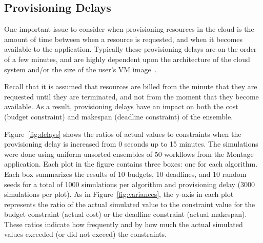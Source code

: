 \documentclass[conference]{IEEEtran}
\begin{document}
\subsection{Provisioning Delays}
\label{sec:delays}

One important issue to consider when provisioning resources in the cloud is the amount of time between when a resource is requested, and when it becomes available to the application. Typically these provisioning delays are on the order of a few minutes, and are highly dependent upon the architecture of the cloud system and/or the size of the user's VM image~\cite{Nurmi2008b}.

Recall that it is assumed that resources are billed from the minute that they are requested until they are terminated, and not from the moment that they become available. As a result, provisioning delays have an impact on both the cost (budget constraint) and makespan (deadline constraint) of the ensemble.

Figure~\ref{fig:delays} shows the ratios of actual values to constraints when the provisioning delay is increased from 0 seconds up to 15 minutes. The simulations were done using uniform unsorted ensembles of 50 workflows from the Montage application. Each plot in the figure contains three boxes: one for each algorithm. Each box summarizes the results of 10 budgets, 10 deadlines, and 10 random seeds for a total of 1000 simulations per algorithm and provisioning delay (3000 simulations per plot). As in Figure~\ref{fig:variances}, the y-axis in each plot represents the ratio of the actual simulated value to the constraint value for the budget constraint (actual cost) or the deadline constraint (actual makespan). These ratios indicate how frequently and by how much the actual simulated values exceeded (or did not exceed) the constraints.

\end{document}
